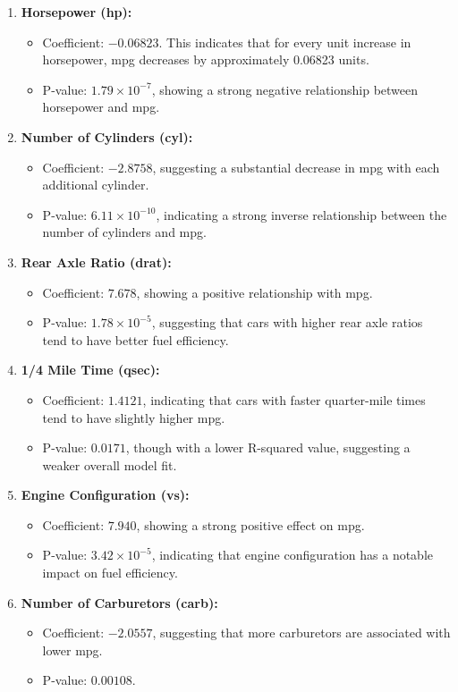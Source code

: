 \documentclass[11pt]{article}\usepackage[]{graphicx}\usepackage[]{xcolor}
\begin{document}
\begin{enumerate}
    \item \textbf{Horsepower (hp):}
    \begin{itemize}
        \item Coefficient: $-0.06823$. This indicates that for every unit increase in horsepower, mpg decreases by approximately 0.06823 units.
        \item P-value: $1.79 \times 10^{-7}$, showing a strong negative relationship between horsepower and mpg.
    \end{itemize}

    \item \textbf{Number of Cylinders (cyl):}
    \begin{itemize}
        \item Coefficient: $-2.8758$, suggesting a substantial decrease in mpg with each additional cylinder.
        \item P-value: $6.11 \times 10^{-10}$, indicating a strong inverse relationship between the number of cylinders and mpg.
    \end{itemize}

    \item \textbf{Rear Axle Ratio (drat):}
    \begin{itemize}
        \item Coefficient: $7.678$, showing a positive relationship with mpg.
        \item P-value: $1.78 \times 10^{-5}$, suggesting that cars with higher rear axle ratios tend to have better fuel efficiency.
    \end{itemize}

    \item \textbf{1/4 Mile Time (qsec):}
    \begin{itemize}
        \item Coefficient: $1.4121$, indicating that cars with faster quarter-mile times tend to have slightly higher mpg.
        \item P-value: $0.0171$, though with a lower R-squared value, suggesting a weaker overall model fit.
    \end{itemize}

    \item \textbf{Engine Configuration (vs):}
    \begin{itemize}
        \item Coefficient: $7.940$, showing a strong positive effect on mpg.
        \item P-value: $3.42 \times 10^{-5}$, indicating that engine configuration has a notable impact on fuel efficiency.
    \end{itemize}

    \item \textbf{Number of Carburetors (carb):}
    \begin{itemize}
        \item Coefficient: $-2.0557$, suggesting that more carburetors are associated with lower mpg.
        \item P-value: $0.00108$.
    \end{itemize}
\end{enumerate}
\end{document}
